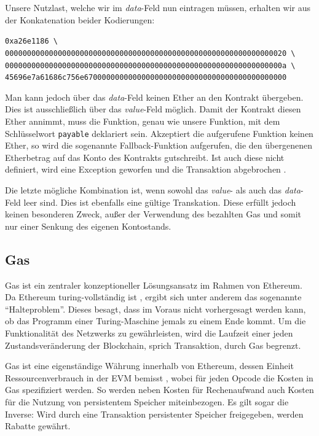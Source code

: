 \documentclass[runningheads]{llncs}
\begin{document}
Unsere Nutzlast, welche wir im \textit{data}-Feld nun eintragen müssen, erhalten wir aus der Konkatenation beider Kodierungen:

\begingroup
\fontsize{8pt}{10pt}\selectfont
\begin{center}
  \texttt{0xa26e1186 \textbackslash} \\
  \texttt{0000000000000000000000000000000000000000000000000000000000000020 \textbackslash} \\
  \texttt{000000000000000000000000000000000000000000000000000000000000000a \textbackslash} \\
  \texttt{45696e7a61686c756e6700000000000000000000000000000000000000000000}
\end{center}
\endgroup

Man kann jedoch über das \textit{data}-Feld keinen Ether an den Kontrakt übergeben. Dies ist ausschließlich über das \textit{value}-Feld möglich. Damit der Kontrakt diesen Ether annimmt, muss die Funktion, genau wie unsere Funktion, mit dem Schlüsselwort \texttt{payable} deklariert sein. Akzeptiert die aufgerufene Funktion keinen Ether, so wird die sogenannte Fallback-Funktion aufgerufen, die den übergenenen Etherbetrag auf das Konto des Kontrakts gutschreibt. Ist auch diese nicht definiert, wird eine Exception geworfen und die Transaktion abgebrochen \cite{noauthor_contract_nodate}.

Die letzte mögliche Kombination ist, wenn sowohl das \textit{value}- als auch das \textit{data}-Feld leer sind. Dies ist ebenfalls eine gültige Transkation. Diese erfüllt jedoch keinen besonderen Zweck, außer der Verwendung des bezahlten Gas und somit nur einer Senkung des eigenen Kontostands.

\subsection{Gas}
\label{gas}
Gas ist ein zentraler konzeptioneller Lösungsansatz im Rahmen von Ethereum. Da Ethereum turing-vollständig ist \cite[S. 1]{wood_ethereum/yellowpaper_2019}, ergibt sich unter anderem das sogenannte "`Halteproblem"'. Dieses besagt, dass im Voraus nicht vorhergesagt werden kann, ob das Programm einer Turing-Maschine jemals zu einem Ende kommt. \cite[S.70]{davis_computability_2013} Um die Funktionalität des Netzwerks zu gewährleisten, wird die Laufzeit einer jeden Zustandsveränderung der Blockchain, sprich Transaktion, durch Gas begrenzt.

Gas ist eine eigenständige Währung innerhalb von Ethereum, dessen Einheit Ressourcenverbrauch in der EVM bemisst \cite[S. 9:3]{m.spain_oasics-tokeneconomics_2019}, wobei für jeden Opcode die Kosten in Gas spezifiziert werden. \cite[S. 25 ff.]{wood_ethereum/yellowpaper_2019} So werden neben Kosten für Rechenaufwand auch Kosten für die Nutzung von persistentem Speicher miteinbezogen. Es gilt sogar die Inverse: Wird durch eine Transaktion persistenter Speicher freigegeben, werden Rabatte gewährt.
\end{document}
